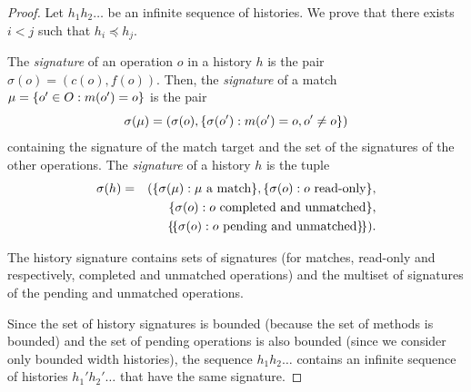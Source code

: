 \begin{proof}

%
%

Let $h_1 h_2\ldots $ be an infinite sequence of histories. We prove that there exists $i<j$ such that $h_i\preceq h_j$.

The \emph{signature} of an operation $o$ in a history $h$ is the pair $\sigma(o)=(c(o),f(o))$.
Then, the \emph{signature} of a match $\mu={\{{ o' \in O : m(o') = o}\}}$ is the pair 
\[
\sigma(\mu)=(\sigma(o),{\{{\sigma(o') : m(o')=o, o'\neq o}\}})
\]
containing the signature of the match target and the set of the signatures of the other operations.
The \emph{signature} of a history $h$ is the tuple 
\begin{align*}
\sigma(h)&=&({\{{\sigma(\mu): \mu\mbox{ a match}}\}}, {\{{\sigma(o): o\mbox{ read-only}}\}}, \\
&& {\{{\sigma(o): o\mbox{ completed and unmatched}}\}}, \\
&& {\{\!\{ \sigma(o): o\mbox{ pending and unmatched} \}\!\}}).
\end{align*}

The history signature contains sets of signatures 
(for matches, read-only and respectively, completed and unmatched operations) 
and the multiset of signatures of the pending and unmatched operations.

Since the set of history signatures is bounded (because the set of methods is bounded)
and the set of pending operations is also bounded (since we consider only bounded width histories),
the sequence $h_1 h_2\ldots $ contains an infinite sequence of histories $h_1' h_2' \ldots$ that have 
the same signature. 


\end{proof}
